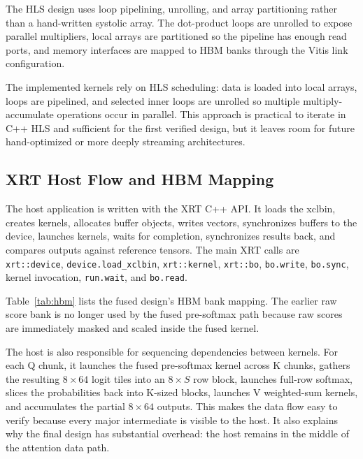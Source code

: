 \documentclass[conference]{IMSTemplate}
\begin{document}
The HLS design uses loop pipelining, unrolling, and array partitioning rather
than a hand-written systolic array. The dot-product loops are unrolled to expose
parallel multipliers, local arrays are partitioned so the pipeline has enough
read ports, and memory interfaces are mapped to HBM banks through the Vitis
link configuration.

The implemented kernels rely on HLS scheduling: data is loaded into local
arrays, loops are pipelined, and selected inner loops are unrolled so multiple
multiply-accumulate operations occur in parallel. This approach is practical to
iterate in C++ HLS and sufficient for the first verified design, but it leaves
room for future hand-optimized or more deeply streaming architectures.

\subsection{XRT Host Flow and HBM Mapping}

The host application is written with the XRT C++ API. It loads the xclbin,
creates kernels, allocates buffer objects, writes vectors, synchronizes buffers
to the device, launches kernels, waits for completion, synchronizes results
back, and compares outputs against reference tensors. The main XRT calls are
\texttt{xrt::device}, \texttt{device.load\_xclbin}, \texttt{xrt::kernel},
\texttt{xrt::bo}, \texttt{bo.write}, \texttt{bo.sync}, kernel invocation,
\texttt{run.wait}, and \texttt{bo.read}.

Table~\ref{tab:hbm} lists the fused design's HBM bank mapping. The earlier raw
score bank is no longer used by the fused pre-softmax path because raw scores
are immediately masked and scaled inside the fused kernel.

The host is also responsible for sequencing dependencies between kernels. For
each Q chunk, it launches the fused pre-softmax kernel across K chunks, gathers
the resulting \(8\times64\) logit tiles into an \(8\times S\) row block,
launches full-row softmax, slices the probabilities back into K-sized blocks,
launches V weighted-sum kernels, and accumulates the partial \(8\times64\)
outputs. This makes the data flow easy to verify because every major
intermediate is visible to the host. It also explains why the final design has
substantial overhead: the host remains in the middle of the attention data path.
\end{document}
